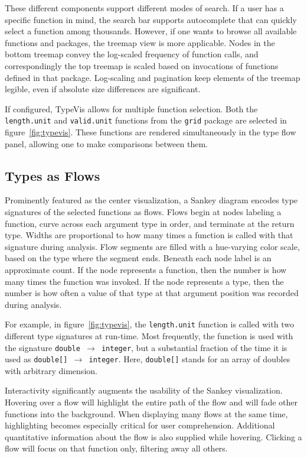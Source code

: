 \documentclass{vgtc}                          %
\begin{document}
These different components support different modes of search.
If a user has a specific function in mind,
the search bar supports autocomplete
that can quickly select a function among thousands.
However, if one wants to browse
all available functions and packages,
the treemap view is more applicable.
Nodes in the bottom treemap convey the log-scaled
frequency of function calls,
and correspondingly the top treemap
is scaled based on invocations
of functions defined in that package.
Log-scaling and pagination keep
elements of the treemap legible,
even if absolute size differences are significant.

If configured, {\sc TypeVis} allows for multiple function selection.
Both the {\tt length.unit} and {\tt valid.unit} functions
from the {\tt grid} package are selected in figure~\ref{fig:typevis}.
These functions are rendered simultaneously in the type flow
panel, allowing one to make comparisons between them.

\subsection{Types as Flows}

Prominently featured as the center visualization,
a Sankey diagram encodes type signatures of the selected
functions as flows.
Flows begin at nodes labeling a function,
curve across each argument type in order,
and terminate at the return type.
Widths are proportional to how many times a function
is called with that signature during analysis.
Flow segments are filled with a hue-varying color scale,
based on the type where the segment ends.
Beneath each node label is an approximate count.
If the node represents a function, then the
number is how many times the function was invoked.
If the node represents a type, then the
number is how often a value of that type
at that argument position was recorded during analysis.

For example, in figure~\ref{fig:typevis},
the {\tt length.unit} function is called with
two different type signatures at run-time.
Most frequently, the function is used with the
signature {\tt double $\to$ integer},
but a substantial fraction of the time it is
used as {\tt double[] $\to$ integer}.
Here, {\tt double[]} stands for an array of
doubles with arbitrary dimension.

Interactivity significantly augments the
usability of the Sankey visualization.
Hovering over a flow will highlight the
entire path of the flow
and will fade other functions
into the background.
When displaying many flows at the same time,
highlighting becomes especially critical
for user comprehension.
Additional quantitative information
about the flow is also supplied
while hovering.
Clicking a flow will focus on that function
only, filtering away all others.
\end{document}
